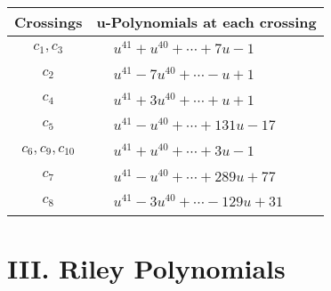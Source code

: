 \documentclass[1p]{elsarticle_modified}
\theoremstyle{definition}
\begin{document}
\begin{tabular}{m{50pt}|m{274pt}}
Crossings & \hspace{64pt}u-Polynomials at each crossing \\
\hline $$\begin{aligned}c_{1},c_{3}\end{aligned}$$&$\begin{aligned}
&u^{41}+u^{40}+\cdots+7 u-1
\end{aligned}$\\
\hline $$\begin{aligned}c_{2}\end{aligned}$$&$\begin{aligned}
&u^{41}-7 u^{40}+\cdots- u+1
\end{aligned}$\\
\hline $$\begin{aligned}c_{4}\end{aligned}$$&$\begin{aligned}
&u^{41}+3 u^{40}+\cdots+u+1
\end{aligned}$\\
\hline $$\begin{aligned}c_{5}\end{aligned}$$&$\begin{aligned}
&u^{41}- u^{40}+\cdots+131 u-17
\end{aligned}$\\
\hline $$\begin{aligned}c_{6},c_{9},c_{10}\end{aligned}$$&$\begin{aligned}
&u^{41}+u^{40}+\cdots+3 u-1
\end{aligned}$\\
\hline $$\begin{aligned}c_{7}\end{aligned}$$&$\begin{aligned}
&u^{41}- u^{40}+\cdots+289 u+77
\end{aligned}$\\
\hline $$\begin{aligned}c_{8}\end{aligned}$$&$\begin{aligned}
&u^{41}-3 u^{40}+\cdots-129 u+31
\end{aligned}$\\
\hline
\end{tabular}\newpage\renewcommand{\arraystretch}{1}
\centering \section*{ III. Riley Polynomials}
\end{document}
